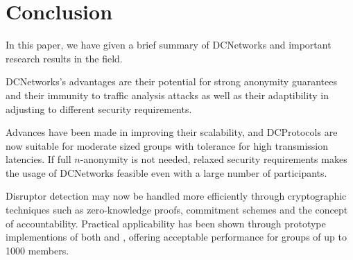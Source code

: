 \section{Conclusion}

In this paper, we have given a brief summary of \acp{DCNetwork} and important
research results in the field.

\acp{DCNetwork}'s advantages are their potential for strong anonymity guarantees
and their immunity to traffic analysis attacks as well as their adaptibility in 
adjusting to different security requirements.

Advances have been made in improving their scalability, and \acp{DCProtocol} 
are now suitable for moderate sized groups with tolerance for high
transmission latencies. If full $n$-anonymity is not needed, relaxed
security requirements makes the usage of \acp{DCNetwork} feasible even with
a large number of participants.

Disruptor detection may now be handled more efficiently through cryptographic techniques
such as zero-knowledge proofs, commitment schemes and the concept of accountability.
Practical applicability
has been shown through prototype implementions of both \Verdict and \Dissent, offering
acceptable performance for groups of up to 1000 members.

\begin{comment}
Important points:

* Non-interactive
* Computationally/Unconditionally secure
* No central trusted party
* Shuffled send
* Security goals: integrity, anonymity, accountability (See dissent 2.3)
* Attack model (dissent 2.3)
* Assumptions, highlight difference between them (Faulty nodes never silent, ..., dissent 2.4)

Sections:

* 88: Base protocol
* 89: Disco (unconditional untraceability, computationally secure serviceability)
* 89: Waidner (Unreliable channel)
* 90: Detection of disruptors
* (03: Herbivore)
* 03: k-anonymity (maybe this is related work instead? weakens security goals to gain efficiency). Small DC subnets.
* 04: dc-revisited (proactive accountability. efficient cheater detection + recovery)
* 10: Dissent
* 13: Verdict

Definitions:

* Anonymity set
* Anonymity terms (cite def paper)
* Anonymity game (dissent [7])
* k-anonymity (k-anonymity)
* Robustness? (k-anonymity 3.3)
* (Partial, Full) Collusion
* Disruption
* Anytrust assumption
* Zero knowledge proofs

Attacks:

* Sybil (dissent [17])
* Sock puppetry (dissent [36])
* Traffic analysis (verdict [4, 34, 38])

Related work:

* Mix nets
* Crowds (dissent [29])
* CliqueNet (k-anon [17])
* Verifiable shuffles
* Group signatures, ring signatures
* Herbivore

Random notes:

* k-anonymous provide anonymity only when most members are honest (see dissent, related work)
* Herbivore provides anonymity only within small subgroups

\end{comment}
